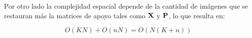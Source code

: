 Por otro lado la complejidad espacial depende de la cantidad de im\'agenes que se restauran m\'as la matrices de apoyo tales como $\X$ y $\P$, lo que resulta en:

\begin{equation}
	O(KN) + O(nN) = \boxed{O(N(K + n))}
	\label{eq:spacial_complexity}
\end{equation}